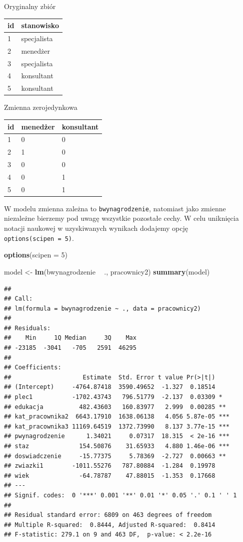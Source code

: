 \documentclass[]{book}
\newenvironment{Shaded}{\begin{snugshade}}{\end{snugshade}}
\newcommand{\DataTypeTok}[1]{\textcolor[rgb]{0.13,0.29,0.53}{#1}}
\newcommand{\DecValTok}[1]{\textcolor[rgb]{0.00,0.00,0.81}{#1}}
\newcommand{\KeywordTok}[1]{\textcolor[rgb]{0.13,0.29,0.53}{\textbf{#1}}}
\newcommand{\NormalTok}[1]{#1}
\newcommand{\OperatorTok}[1]{\textcolor[rgb]{0.81,0.36,0.00}{\textbf{#1}}}
\newcommand{\StringTok}[1]{\textcolor[rgb]{0.31,0.60,0.02}{#1}}
\begin{document}
Oryginalny zbiór

\begin{longtable}[]{@{}ll@{}}
\toprule
id & stanowisko\tabularnewline
\midrule
\endhead
1 & specjalista\tabularnewline
2 & menedżer\tabularnewline
3 & specjalista\tabularnewline
4 & konsultant\tabularnewline
5 & konsultant\tabularnewline
\bottomrule
\end{longtable}

Zmienna zerojedynkowa

\begin{longtable}[]{@{}lll@{}}
\toprule
id & menedżer & konsultant\tabularnewline
\midrule
\endhead
1 & 0 & 0\tabularnewline
2 & 1 & 0\tabularnewline
3 & 0 & 0\tabularnewline
4 & 0 & 1\tabularnewline
5 & 0 & 1\tabularnewline
\bottomrule
\end{longtable}

W modelu zmienna zależna to \texttt{bwynagrodzenie}, natomiast jako zmienne niezależne bierzemy pod uwagę wszystkie pozostałe cechy. W celu uniknięcia notacji naukowej w uzyskiwanych wynikach dodajemy opcję \texttt{options(scipen\ =\ 5)}.

\begin{Shaded}
\begin{Highlighting}[]
\KeywordTok{options}\NormalTok{(}\DataTypeTok{scipen =} \DecValTok{5}\NormalTok{)}

\NormalTok{model <-}\StringTok{ }\KeywordTok{lm}\NormalTok{(bwynagrodzenie }\OperatorTok{~}\StringTok{ }\NormalTok{., pracownicy2)}
\KeywordTok{summary}\NormalTok{(model)}
\end{Highlighting}
\end{Shaded}

\begin{verbatim}
## 
## Call:
## lm(formula = bwynagrodzenie ~ ., data = pracownicy2)
## 
## Residuals:
##    Min     1Q Median     3Q    Max 
## -23185  -3041   -705   2591  46295 
## 
## Coefficients:
##                    Estimate  Std. Error t value Pr(>|t|)    
## (Intercept)     -4764.87418  3590.49652  -1.327  0.18514    
## plec1           -1702.43743   796.51779  -2.137  0.03309 *  
## edukacja          482.43603   160.83977   2.999  0.00285 ** 
## kat_pracownika2  6643.17910  1638.06138   4.056 5.87e-05 ***
## kat_pracownika3 11169.64519  1372.73990   8.137 3.77e-15 ***
## pwynagrodzenie      1.34021     0.07317  18.315  < 2e-16 ***
## staz              154.50876    31.65933   4.880 1.46e-06 ***
## doswiadczenie     -15.77375     5.78369  -2.727  0.00663 ** 
## zwiazki1        -1011.55276   787.80884  -1.284  0.19978    
## wiek              -64.78787    47.88015  -1.353  0.17668    
## ---
## Signif. codes:  0 '***' 0.001 '**' 0.01 '*' 0.05 '.' 0.1 ' ' 1
## 
## Residual standard error: 6809 on 463 degrees of freedom
## Multiple R-squared:  0.8444, Adjusted R-squared:  0.8414 
## F-statistic: 279.1 on 9 and 463 DF,  p-value: < 2.2e-16
\end{verbatim}
\end{document}
